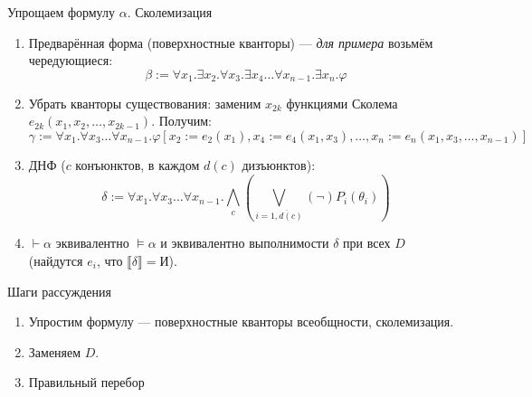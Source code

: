 \documentclass[aspectratio=169]{beamer}
\begin{document}
\begin{frame}{Упрощаем формулу $\alpha$. Сколемизация}
\begin{enumerate}
\item Предварённая форма (поверхностные кванторы) --- \emph{для примера} возьмём чередующиеся:
$$\beta := \forall x_1.\exists x_2.\forall x_3.\exists x_4\dots \forall x_{n-1}.\exists x_n.\varphi$$


\item Убрать кванторы существования: заменим $x_{2k}$ функциями Сколема $e_{2k}(x_1,x_2,\dots,x_{2k-1})$.
Получим: $$\gamma := \forall x_1.\forall x_3\dots\forall x_{n-1}.\varphi[x_2:=e_2(x_1), x_4:=e_4(x_1,x_3), \dots, x_n := e_n(x_1,x_3,\dots,x_{n-1})]$$


\item ДНФ ($c$ конъюнктов, в каждом $d(c)$ дизъюнктов):
$$\delta := \forall x_1.\forall x_3\dots\forall x_{n-1}.\bigwedge_c\left(\bigvee_{i = \overline{1,d(c)}} (\neg)P_i(\theta_i)\right)$$

\item $\vdash\alpha$ эквивалентно $\models\alpha$ и эквивалентно выполнимости $\delta$ при всех $D$ 
(найдутся $e_i$, что $\llbracket\delta\rrbracket = \text{И}$).

\end{enumerate}
\end{frame}

\begin{frame}{Шаги рассуждения}
\begin{enumerate}
\item \color{gray}Упростим формулу --- поверхностные кванторы всеобщности, сколемизация.
\item \color{black}Заменяем $D$.
\item \color{gray}Правильный перебор
\end{enumerate}
\end{frame}
\end{document}
